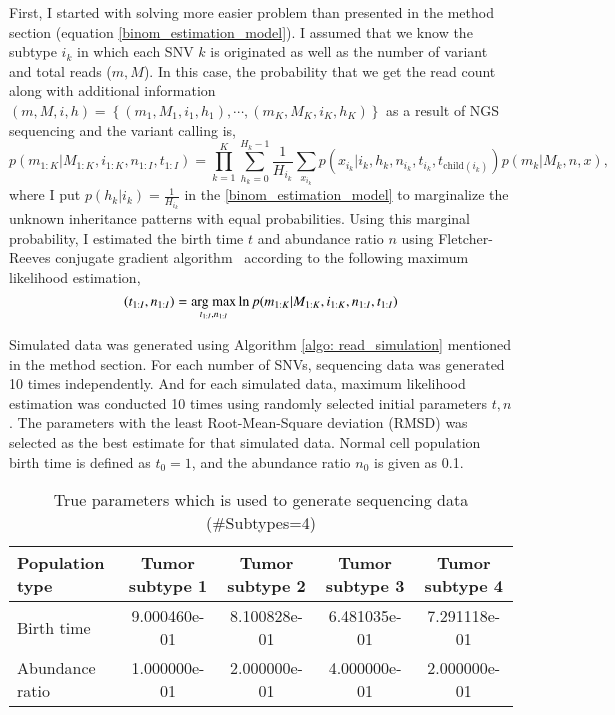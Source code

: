 \documentclass{article}
\begin{document}
First, I started with solving more easier problem than presented in the method section (equation \ref{binom_estimation_model}).
I assumed that we know the subtype $i_k$ in which each SNV $k$ is originated as well as the number of variant and total reads ($m, M$).
In this case, the probability that we get the read count along with additional information $(m,M,i,h) = \left\{(m_1, M_1, i_1, h_1), \cdots, (m_K, M_K, i_K, h_K) \right\}$ as a result of NGS sequencing and the variant calling is,
\begin{equation}
  p(m_{1:K}|M_{1:K}, i_{1:K}, n_{1:I}, t_{1:I}) = \prod_{k=1}^{K} \sum_{h_k=0}^{H_k-1} \frac{1}{H_{i_k}} \sum_{x_{i_k}} p(x_{i_k} | i_k, h_k, n_{i_k}, t_{i_k}, t_{\mathrm{child}(i_k)}) p (m_k | M_k, n, x),
\end{equation}
where I put $p(h_k | i_k) = \frac{1}{H_{i_k}}$ in the \eqref{binom_estimation_model} to marginalize the unknown inheritance patterns with equal probabilities.
Using this marginal probability, I estimated the birth time $t$ and abundance ratio $n$ using Fletcher-Reeves conjugate gradient algorithm~\cite{fletcher1964function} according to the following maximum likelihood estimation,
\begin{equation}
 (t_{1:I}, n_{1:I}) = \mathop{\rm arg~max}\limits_{t_{1:I}, n_{1:I}} \ln p(m_{1:K} | M_{1:K}, i_{1:K}, n_{1:I}, t_{1:I})
\end{equation}

Simulated data was generated using Algorithm \ref{algo: read_simulation} mentioned in the method section.
For each number of SNVs, sequencing data was generated 10 times independently. And for each simulated data, maximum likelihood estimation was conducted 10 times using randomly selected initial parameters $t, n$. The parameters with the least Root-Mean-Square deviation (RMSD) was selected as the best estimate for that simulated data.
Normal cell population birth time is defined as $t_{0}=1$, and the abundance ratio $n_{0}$ is given as 0.1.

\begin{table}[H]
\begin{center}
 \caption{True parameters which is used to generate sequencing data (\#Subtypes=4)}
 \label{tab: true_parameters_4_2_original}
  \begin{tabular}[t]{lcccc}\toprule
  Population type & Tumor subtype 1 & Tumor subtype 2 & Tumor subtype 3 & Tumor subtype 4\\\midrule
  Birth time & 9.000460e-01 & 8.100828e-01 & 6.481035e-01 & 7.291118e-01\\
  Abundance ratio & 1.000000e-01 & 2.000000e-01 & 4.000000e-01 & 2.000000e-01\\\bottomrule
 \end{tabular}
\end{center}
\end{table}
\end{document}
